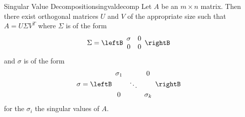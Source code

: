 \begin{theorem}{Singular Value Decomposition}{singvaldecomp}
Let $A$ be an $m\times n$ matrix. Then there exist
orthogonal matrices $U$ and $V$ of the appropriate size such that $A= U \Sigma V^T$ where $\Sigma$ is of the form
\[
\Sigma = 
\leftB 
\begin{array}{cc}
\sigma & 0 \\ 
0 & 0
\end{array}
\rightB
\]
and $\sigma $ is of the form 
\[
\sigma =\leftB 
\begin{array}{ccc}
\sigma _{1} &  & 0 \\ 
& \ddots &  \\ 
0 &  & \sigma _{k}
\end{array}
\rightB
\]
for the $\sigma _{i}$ the singular values of $A.$
\end{theorem}

